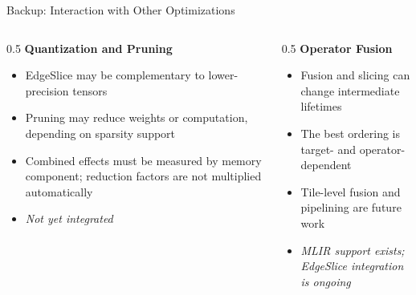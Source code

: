 \documentclass[10pt,aspectratio=169]{beamer}
\begin{document}
\begin{frame}{Backup: Interaction with Other Optimizations}
\begin{columns}
\begin{column}{0.5\textwidth}
\textbf{Quantization and Pruning}
\begin{itemize}
\small
\item EdgeSlice may be complementary to lower-precision tensors
\item Pruning may reduce weights or computation, depending on sparsity support
\item Combined effects must be measured by memory component; reduction factors are not multiplied automatically
\item \textit{Not yet integrated}
\end{itemize}
\end{column}

\begin{column}{0.5\textwidth}
\textbf{Operator Fusion}
\begin{itemize}
\small
\item Fusion and slicing can change intermediate lifetimes
\item The best ordering is target- and operator-dependent
\item Tile-level fusion and pipelining are future work
\item \textit{MLIR support exists; EdgeSlice integration is ongoing}
\end{itemize}
\end{column}
\end{columns}
\end{frame}
\end{document}

